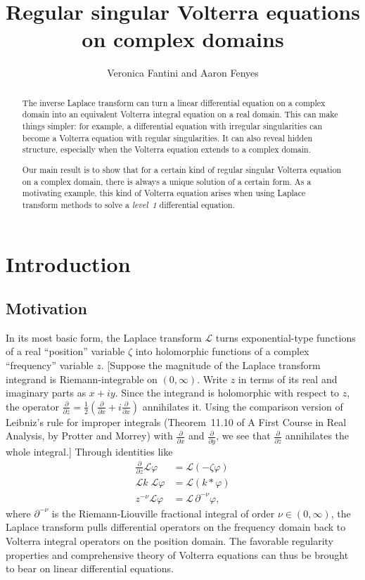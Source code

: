 \documentclass{article}
\title{Regular singular Volterra equations on complex domains}
\author{Veronica Fantini and Aaron Fenyes}
\date{}
\theoremstyle{definition}
\theoremstyle{plain}
\newcommand{\laplace}{\mathcal{L}}
\newenvironment{verify}{\color{ForestGreen}}{\color{black}}
\begin{document}
\maketitle

\begin{abstract}
The inverse Laplace transform can turn a linear differential equation on a complex domain into an equivalent Volterra integral equation on a real domain. This can make things simpler: for example, a differential equation with irregular singularities can become a Volterra equation with regular singularities. It can also reveal hidden structure, especially when the Volterra equation extends to a complex domain.

Our main result is to show that for a certain kind of regular singular Volterra equation on a complex domain, there is always a unique solution of a certain form. As a motivating example, this kind of Volterra equation arises when using Laplace transform methods to solve a {\em level~1} differential equation.
\end{abstract}
\tableofcontents
\section{Introduction}\label{sec:intro}
\subsection{Motivation}\label{motivation}
In its most basic form, the Laplace transform $\laplace$ turns exponential-type functions of a real ``position'' variable $\zeta$ into holomorphic functions of a complex ``frequency'' variable $z$. \begin{verify}[Suppose the magnitude of the Laplace transform integrand is Riemann-integrable on $(0, \infty)$. Write $z$ in terms of its real and imaginary parts as $x + iy$. Since the integrand is holomorphic with respect to $z$, the operator $\frac{\partial}{\partial\overline{z}} = \frac{1}{2}\left(\frac{\partial}{\partial x} + i\frac{\partial}{\partial x}\right)$ annihilates it. Using the comparison version of Leibniz's rule for improper integrals (Theorem~11.10 of A First Course in Real Analysis, by Protter and Morrey) with $\frac{\partial}{\partial x}$ and $\frac{\partial}{\partial y}$, we see that $\frac{\partial}{\partial\overline{z}}$ annihilates the whole integral.]\end{verify} Through identities like
\begin{align*}
\frac{\partial}{\partial z} \laplace \varphi & = \laplace(-\zeta\varphi) \\
\laplace k\;\laplace \varphi & = \laplace(k * \varphi) \\
z^{-\nu} \laplace \varphi & = \laplace\,\partial^{-\nu} \varphi,
\end{align*}
where $\partial^{-\nu}$ is the Riemann-Liouville fractional integral of order $\nu \in (0, \infty)$, the Laplace transform pulls differential operators on the frequency domain back to Volterra integral operators on the position domain. The favorable regularity properties and comprehensive theory of Volterra equations can thus be brought to bear on linear differential equations.
\end{document}
